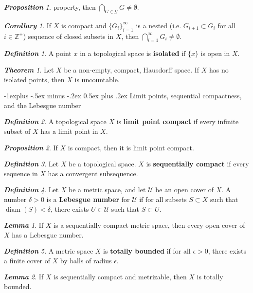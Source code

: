 \documentclass[frenchspacing,9pt,landscape,a4paper]{article}
\makeatletter
\renewcommand{\subsection}{\@startsection{subsection}{2}{0mm}%
                                {-1explus -.5ex minus -.2ex}%
                                {0.5ex plus .2ex}%
                                {\normalfont\normalsize\bfseries}}
\newcommand{\BZ}{\mathbb Z}
\DeclareMathOperator{\diam}{diam}
\theoremstyle{remark}
\newtheorem*{thm}{\textbf{Theorem}}
\newtheorem*{defn}{\textbf{Definition}}
\newtheorem*{prop}{\textbf{Proposition}}
\newtheorem*{lem}{\textbf{Lemma}}
\newtheorem*{cor}{\textbf{Corollary}}
\makeatother
\begin{document}
\begin{multicols}{4}
\begin{prop}
    property, then  $\bigcap_{G\in\mathcal{G}} G\neq\emptyset$.
\end{prop}
\begin{cor}
    If $X$ is compact and  $\{G_i\}_{i=1}^\infty$ is a nested (i.e. $G_{i+1}\subset G_i$ for all
    $i\in\BZ^+$) sequence of closed subsets in $X$, then  $\bigcap_{i=1}^\infty G_i\neq\emptyset$.
\end{cor}
\begin{defn}
    A point $x$ in a topological space is \textbf{isolated} if $\{x\}$ is open in  $X$.
\end{defn}
\begin{thm}
    Let $X$ be a non-empty, compact, Hausdorff space. If  $X$ has no isolated points, then  $X$ is
    uncountable.
\end{thm}
\subsection{Limit points, sequential compactness, and the Lebesgue number}
\begin{defn}
    A topological space $X$ is \textbf{limit point compact} if every infinite subset of  $X$ has a limit
    point in  $X$.
\end{defn}
\begin{prop}
    If $X$ is compact, then it is limit point compact.
\end{prop}
\begin{defn}
    Let $X$ be a topological space.  $X$ is \textbf{sequentially compact} if every sequence in  $X$ has a
    convergent subsequence.
\end{defn}
\begin{defn}
    Let $X$ be a metric space, and let  $\mathcal{U}$ be an open cover of  $X$. A number  $\delta>0$ is a
    \textbf{Lebesgue number} for $\mathcal{U}$ if for all subsets  $S\subset X$ such that
    $\diam(S)<\delta$, there exists  $U\in\mathcal{U}$ such that  $S\subset U$.
\end{defn}
\begin{lem}
    If $X$ is a sequentially compact metric space, then every open cover of $X$ has a Lebesgue number.
\end{lem}
\begin{defn}
    A metric space $X$ is \textbf{totally bounded} if for all $\epsilon>0$, there exists a finite cover of
     $X$ by balls of radius  $\epsilon$.
\end{defn}
\begin{lem}
    If $X$ is sequentially compact and metrizable, then  $X$ is totally bounded.

\end{lem}
\end{multicols}
\end{document}

